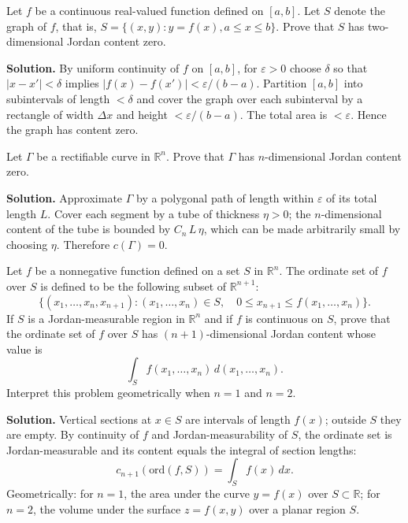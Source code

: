 \begin{problembox}
Let \( f \) be a continuous real-valued function defined on \([a, b]\). Let \( S \) denote the graph of \( f \), that is, \( S = \{(x, y) : y = f(x), a \leq x \leq b\} \). Prove that \( S \) has two-dimensional Jordan content zero.
\end{problembox}

\noindent\textbf{Solution.}
By uniform continuity of $f$ on $[a,b]$, for $\varepsilon>0$ choose $\delta$ so that $|x-x'|<\delta$ implies $|f(x)-f(x')|<\varepsilon/(b-a)$. Partition $[a,b]$ into subintervals of length $<\delta$ and cover the graph over each subinterval by a rectangle of width $\Delta x$ and height $<\varepsilon/(b-a)$. The total area is $<\varepsilon$. Hence the graph has content zero.

\begin{problembox}
Let \( \Gamma \) be a rectifiable curve in \( \mathbb{R}^n \). Prove that \( \Gamma \) has \( n \)-dimensional Jordan content zero.
\end{problembox}

\noindent\textbf{Solution.}
Approximate $\Gamma$ by a polygonal path of length within $\varepsilon$ of its total length $L$. Cover each segment by a tube of thickness $\eta>0$; the $n$-dimensional content of the tube is bounded by $C_n\,L\,\eta$, which can be made arbitrarily small by choosing $\eta$. Therefore $c(\Gamma)=0$.

\begin{problembox}
Let \( f \) be a nonnegative function defined on a set \( S \) in \( \mathbb{R}^n \). The ordinate set of \( f \) over \( S \) is defined to be the following subset of \( \mathbb{R}^{n+1} \):
\[\{(x_1, \ldots, x_n, x_{n+1}) : (x_1, \ldots, x_n) \in S, \quad 0 \leq x_{n+1} \leq f(x_1, \ldots, x_n)\}.\]
If \( S \) is a Jordan-measurable region in \( \mathbb{R}^n \) and if \( f \) is continuous on \( S \), prove that the ordinate set of \( f \) over \( S \) has \( (n + 1) \)-dimensional Jordan content whose value is
\[\int_{S} f(x_1, \ldots, x_n) \, d(x_1, \ldots, x_n).\]
Interpret this problem geometrically when \( n = 1 \) and \( n = 2 \).
\end{problembox}

\noindent\textbf{Solution.}
Vertical sections at $x\in S$ are intervals of length $f(x)$; outside $S$ they are empty. By continuity of $f$ and Jordan-measurability of $S$, the ordinate set is Jordan-measurable and its content equals the integral of section lengths:
\[ c_{n+1}(\text{ord}(f,S)) = \int_S f(x)\,dx. \]
Geometrically: for $n=1$, the area under the curve $y=f(x)$ over $S\subset\mathbb R$; for $n=2$, the volume under the surface $z=f(x,y)$ over a planar region $S$.

